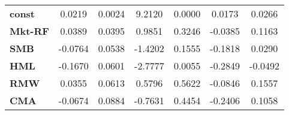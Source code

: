 \begin{center}
\begin{tabular}{lcccccc}
\midrule
\textbf{const}  &       0.0219       &       0.0024       &      9.2120     &      0.0000      &       0.0173      &       0.0266       \\
\textbf{Mkt-RF} &       0.0389       &       0.0395       &      0.9851     &      0.3246      &      -0.0385      &       0.1163       \\
\textbf{SMB}    &      -0.0764       &       0.0538       &     -1.4202     &      0.1555      &      -0.1818      &       0.0290       \\
\textbf{HML}    &      -0.1670       &       0.0601       &     -2.7777     &      0.0055      &      -0.2849      &      -0.0492       \\
\textbf{RMW}    &       0.0355       &       0.0613       &      0.5796     &      0.5622      &      -0.0846      &       0.1557       \\
\textbf{CMA}    &      -0.0674       &       0.0884       &     -0.7631     &      0.4454      &      -0.2406      &       0.1058       \\
\bottomrule
\end{tabular}
\end{center}
